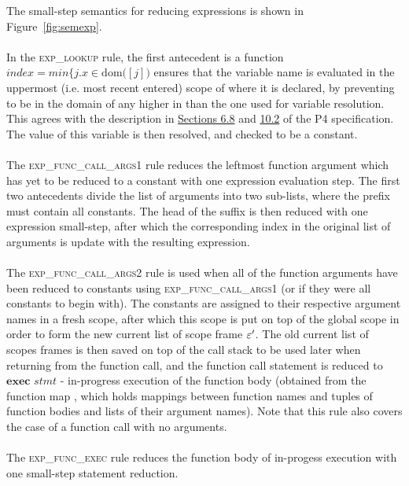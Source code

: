 \documentclass[UTF8]{article}
\begin{document}
The small-step semantics for reducing expressions is shown in Figure~\ref{fig:semexp}.
\\~\\
In the \textsc{exp\_lookup} rule, the first antecedent is a function $index = min  \{ j . x  \in \mathrm{dom} ( $\currsf$ [j] ) $ ensures that the variable name \str{} is evaluated in the uppermost (i.e. most recent entered) scope of \currsf{} where it is declared, by preventing \str{} to be in the domain of any \scope{} higher in \currsf{} than the one used for variable resolution. This agrees with the description in \href{https://p4.org/p4-spec/docs/P4-16-v1.2.1.html#sec-name-resolution}{Sections 6.8} and \href{https://p4.org/p4-spec/docs/P4-16-v1.2.1.html#sec-variables}{10.2} of the P4 specification. The value of this variable is then resolved, and checked to be a constant.\\~\\
The \textsc{exp\_func\_call\_args1} rule reduces the leftmost function argument which has yet to be reduced to a constant with one expression evaluation step. The first two antecedents divide the list of arguments into two sub-lists, where the prefix must contain all constants. The head of the suffix is then reduced with one expression small-step, after which the corresponding index in the original list of arguments is update with the resulting expression.
\\~\\
The \textsc{exp\_func\_call\_args2} rule is used when all of the function arguments have been reduced to constants using \textsc{exp\_func\_call\_args1} (or if they were all constants to begin with). The constants are assigned to their respective argument names in a fresh scope, after which this scope is put on top of the global scope \gscope{} in order to form the new current list of scope frame $\varepsilon '$. The old current list of scopes frames \currsf{} is then saved on top of the call stack \cstack{} to be used later when returning from the function call, and the function call statement is reduced to $\mathbf{exec} \,\, \mathit{stmt}$ - in-progress execution of the function body \stmt{} (obtained from the function map \fmap{}, which holds mappings between function names \str{} and tuples of function bodies and lists of their argument names). Note that this rule also covers the case of a function call with no arguments.
\\~\\
The \textsc{exp\_func\_exec} rule reduces the function body of in-progess execution with one small-step statement reduction.
\end{document}

